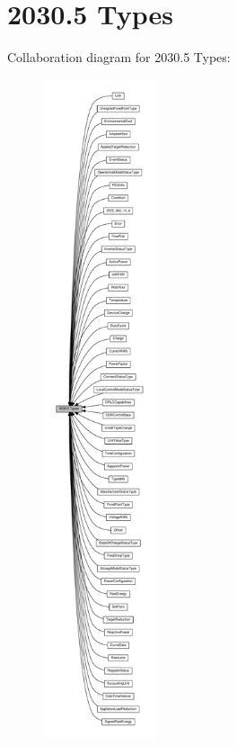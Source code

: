 \hypertarget{group__se__types}{}\section{2030.5 Types}
\label{group__se__types}
Collaboration diagram for 2030.5 Types\+:\nopagebreak
\begin{figure}[H]
\begin{center}
\leavevmode
\includegraphics[height=550pt]{group__se__types}
\end{center}
\end{figure}
